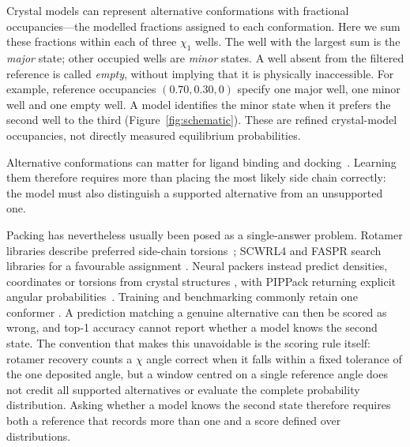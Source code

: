\documentclass[10pt,twocolumn,a4paper]{article}
\begin{document}
Crystal models can represent alternative conformations with fractional occupancies---the modelled fractions assigned to each conformation. Here we sum these fractions within each of three $\chi_1$ wells. The well with the largest sum is the \emph{major} state; other occupied wells are \emph{minor} states. A well absent from the filtered reference is called \emph{empty}, without implying that it is physically inaccessible. For example, reference occupancies $(0.70,0.30,0)$ specify one major well, one minor well and one empty well. A model identifies the minor state when it prefers the second well to the third (Figure~\ref{fig:schematic}). These are refined crystal-model occupancies, not directly measured equilibrium probabilities.

Alternative conformations can matter for ligand binding and docking~\citep{fischer2014flexibility,wankowicz2022ligand,gutermuth2023altloc}. Learning them therefore requires more than placing the most likely side chain correctly: the model must also distinguish a supported alternative from an unsupported one.

Packing has nevertheless usually been posed as a single-answer problem. Rotamer libraries describe preferred side-chain torsions~\citep{ponder1987tertiary,shapovalov2011rotamer};
SCWRL4 and FASPR search libraries for a favourable assignment
\citep{krivov2009scwrl4,huang2020faspr}. Neural packers instead predict densities,
coordinates or torsions from crystal structures
\citep{misiura2022dlpacker,mcpartlon2023attnpacker,zhang2023diffpack,lee2025flowpacker,visani2024hpacker},
with PIPPack returning explicit angular probabilities~\citep{randolph2024pippack}.
Training and benchmarking commonly retain one conformer
\citep{misiura2022dlpacker,randolph2024pippack,vangaru2025packbench}. A prediction
matching a genuine alternative can then be scored as wrong, and top-1 accuracy
cannot report whether a model knows the second state. The convention that makes this
unavoidable is the scoring rule itself: rotamer recovery counts a $\chi$ angle correct
when it falls within a fixed tolerance of the one deposited angle, but a window centred on a single reference angle does not credit all supported alternatives or evaluate the complete probability distribution. Asking whether a model knows the second state therefore requires both a reference
that records more than one and a score defined over distributions.
\end{document}
